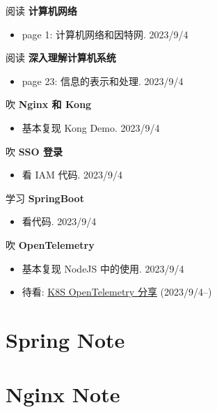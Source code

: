 \documentclass[a4,10pt]{ctexart}
\begin{document}
\begin{yd}{阅读 \textbf{计算机网络}}{}
	\begin{itemize}
		\item page 1: 计算机网络和因特网. 2023/9/4
	\end{itemize}
\end{yd}

\begin{yd}{阅读 \textbf{深入理解计算机系统}}{}
	\begin{itemize}
		\item page 23: 信息的表示和处理. 2023/9/4
	\end{itemize}
\end{yd}

\begin{yd}{吹 \textbf{Nginx 和 Kong}}{}
	\begin{itemize}
		\item 基本复现 Kong Demo. 2023/9/4
	\end{itemize}
\end{yd}

\begin{yd}{吹 \textbf{SSO 登录}}{}
	\begin{itemize}
		\item 看 IAM 代码. 2023/9/4
	\end{itemize}
\end{yd}

\begin{yd}{学习 \textbf{SpringBoot}}{}
	\begin{itemize}
		\item 看代码. 2023/9/4
	\end{itemize}
\end{yd}

\begin{yd}{吹 \textbf{OpenTelemetry}}{}
	\begin{itemize}
		\item 基本复现 NodeJS 中的使用. 2023/9/4
		\item 待看: \href{https://www.bilibili.com/video/BV1cN411a72d/?vd_source=3d6137a386838c2bcb88b1db7c993448}{K8S OpenTelemetry 分享} (2023/9/4--)
	\end{itemize}
\end{yd}

\section{Spring Note}

\section{Nginx Note}
\end{document}
